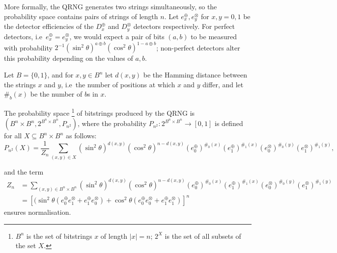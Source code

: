 \documentclass{mscs}
\newtheorem{Proposition}[Theorem]{Proposition}
\begin{document}

More formally, the QRNG generates two strings simultaneously, so the probability space contains pairs of strings of length $n$. Let $e_x^\oplus,e_y^\otimes$ for $x,y=0,1$ be the detector efficiencies of the $D_x^\oplus$ and $D_y^\otimes$ detectors respectively. For perfect detectors, i.e\ $e_x^\oplus = e_y^\otimes$, we would expect a pair of bits $(a,b)$ to be measured with probability $2^{-1} (\sin^2\theta)^{a \oplus b}(\cos^2\theta)^{1-a \oplus b}$; non-perfect detectors alter this probability depending on the values of $a,b$.

Let $B=\{0,1\}$, and for $x,y \in B^n$ let $d(x,y)$ be the Hamming distance between the strings $x$ and $y$, i.e\ the number of positions at which $x$ and $y$ differ, and let $\#_b(x)$ be the number of $b$s in $x$.

	The probability space \footnote{$B^{n}$ is the set of bitstrings  $x$ of length $|x|=n$; $2^{X}$ is the set of all subsets of the set $X$.} of bitstrings produced by the QRNG is $(B^n\times B^n,2^{B^n\times B^n},P_{n^2})$, where the probability $P_{n^2}: 2^{B^n\times B^n} \to [0,1]$ is defined for all $X\subseteq B^n\times B^n$ as follows:
	$$P_{n^2}(X)=\frac{1}{Z_n}\sum_{(x,y)\in X}(\sin^2\theta)^{d(x,y)}(\cos^2\theta)^{n-d(x,y)}(e_0^\oplus)^{\#_0(x)}(e_1^\oplus)^{\#_1(x)}(e_0^\otimes)^{\#_0(y)}(e_1^\otimes)^{\#_1(y)},$$
	
\noindent	and the term
	\begin{align*}
		Z_n&=\sum_{(x,y)\in B^n\times B^n}(\sin^2\theta)^{d(x,y)}(\cos^2\theta)^{n-d(x,y)}(e_0^\oplus)^{\#_0(x)}(e_1^\oplus)^{\#_1(x)}(e_0^\otimes)^{\#_0(y)}(e_1^\otimes)^{\#_1(y)}\\
		&= \left[(\sin^2\theta(e_0^\oplus e_1^\otimes + e_1^\oplus e_0^\otimes)+\cos^2\theta(e_0^\oplus e_0^\otimes + e_1^\oplus e_1^\otimes)  \right]^n
	\end{align*}
ensures normalisation.
\end{document}
